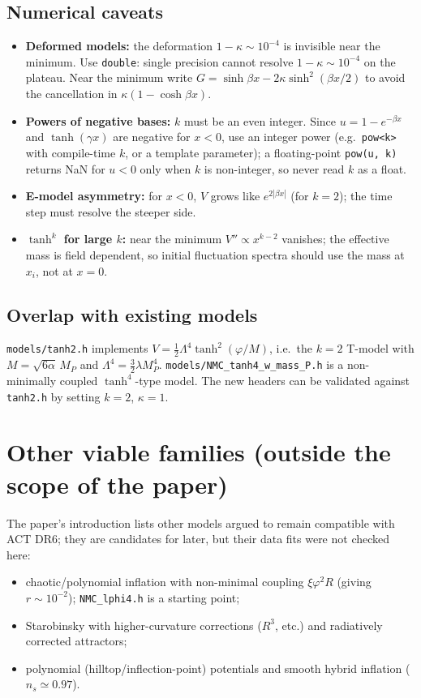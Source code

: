 \documentclass[11pt,a4paper]{article}
\newcommand{\MP}{M_P}
\newcommand{\aatt}{\alpha}
\begin{document}
\subsection{Numerical caveats}
\begin{itemize}
\item \textbf{Deformed models:} the deformation $1-\kappa\sim10^{-4}$ is invisible near the minimum. Use \texttt{double}: single precision cannot resolve $1-\kappa\sim10^{-4}$ on the plateau. Near the minimum write $G=\sinh\beta x-2\kappa\sinh^2(\beta x/2)$ to avoid the cancellation in $\kappa(1-\cosh\beta x)$.
\item \textbf{Powers of negative bases:} $k$ must be an even integer. Since $u=1-e^{-\beta x}$ and $\tanh(\gamma x)$ are negative for $x<0$, use an integer power (e.g.\ \texttt{pow<k>} with compile-time $k$, or a template parameter); a floating-point \texttt{pow(u, k)} returns NaN for $u<0$ only when $k$ is non-integer, so never read $k$ as a float.
\item \textbf{E-model asymmetry:} for $x<0$, $V$ grows like $e^{2|\beta x|}$ (for $k=2$); the time step must resolve the steeper side.
\item \textbf{$\tanh^k$ for large $k$:} near the minimum $V''\propto x^{k-2}$ vanishes; the effective mass is field dependent, so initial fluctuation spectra should use the mass at $x_i$, not at $x=0$.
\end{itemize}

\subsection{Overlap with existing models}
\label{sec:existing}
\texttt{models/tanh2.h} implements $V=\tfrac12\Lambda^4\tanh^2(\varphi/M)$, i.e.\ the $k=2$ T-model with $M=\sqrt{6\aatt}\,\MP$ and $\Lambda^4=\tfrac32\lambda\MP^4$. \texttt{models/NMC\_tanh4\_w\_mass\_P.h} is a non-minimally coupled $\tanh^4$-type model. The new headers can be validated against \texttt{tanh2.h} by setting $k=2$, $\kappa=1$.

\section{Other viable families (outside the scope of the paper)}
\label{sec:others}
The paper's introduction lists other models argued to remain compatible with ACT DR6; they are candidates for later, but their data fits were not checked here:
\begin{itemize}
\item chaotic/polynomial inflation with non-minimal coupling $\xi\varphi^2R$ (giving $r\sim10^{-2}$); \texttt{NMC\_lphi4.h} is a starting point;
\item Starobinsky with higher-curvature corrections ($R^3$, etc.) and radiatively corrected attractors;
\item polynomial (hilltop/inflection-point) potentials and smooth hybrid inflation ($n_s\simeq0.97$).
\end{itemize}
\end{document}
